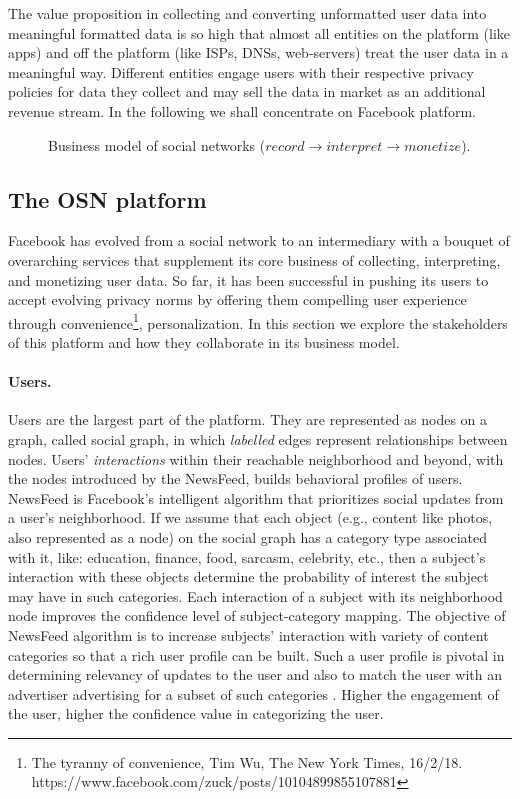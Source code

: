 \documentclass[runningheads]{llncs}
\begin{document}
%
The value proposition in collecting and converting unformatted user
data into meaningful formatted data is so high that almost all
entities on the platform (like apps) and off the platform (like ISPs,
DNSs, web-servers) treat the user data in a meaningful way. Different
entities engage users with their respective privacy policies for data
they collect and may sell the data in market as an additional revenue
stream. In the following we shall concentrate on Facebook platform.
%
\begin{figure*}[!h]
  \centering
  {}
  \caption{Business model of social networks
    ($record \rightarrow interpret \rightarrow monetize$).}
  \label{fig:business-model}
\end{figure*}

\subsection{The OSN platform}
\label{sec:osn-platform}
\noindent Facebook has evolved from a social network to an
intermediary with a bouquet of overarching services that supplement
its core business of collecting, interpreting, and monetizing user
data. So far, it has been successful in pushing its users to accept
evolving privacy norms by offering them compelling user experience
through convenience\footnote{The tyranny of convenience, Tim Wu, The New York Times,
  16/2/18.\\ https://www.facebook.com/zuck/posts/10104899855107881},
personalization. In this section we explore the stakeholders of this
platform and how they collaborate in its business model.

\paragraph{Users.}
Users are the largest part of the platform. They are represented as
nodes on a graph, called social graph, in which \textit{labelled}
edges represent relationships between nodes. Users'
\textit{interactions} within their reachable neighborhood and beyond,
with the nodes introduced by the NewsFeed, builds behavioral profiles
of users. NewsFeed is Facebook's intelligent algorithm that
prioritizes social updates from a user's neighborhood. If we assume
that each object (e.g., content like photos, also represented as a
node) on the social graph has a category type associated with it,
like: education, finance, food, sarcasm, celebrity, etc., then a
subject's interaction with these objects determine the probability of
interest the subject may have in such categories. Each interaction of
a subject with its neighborhood node improves the confidence level of
subject-category mapping. The objective of NewsFeed algorithm is to
increase subjects' interaction with variety of content categories
\cite{ipip-3200} so that a rich user profile can be built. Such a user
profile is pivotal in determining relevancy of updates to the user and
also to match the user with an advertiser advertising for a subset of
such categories \cite{fb-ad-categories}. Higher the engagement of the
user, higher the confidence value in categorizing the user.
\end{document}
